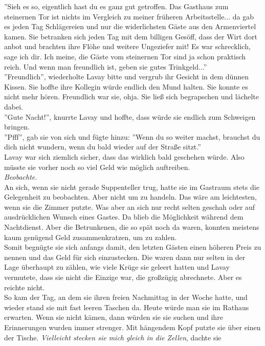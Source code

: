 ''Sieh es so, eigentlich hast du es ganz gut getroffen. Das Gasthaus zum steinernen Tor ist nichts 
im Vergleich zu meiner früheren Arbeitsstelle... da gab es jeden Tag Schlägereien und nur die 
widerlichsten Gäste aus den Armenviertel kamen. Sie betranken sich jeden Tag mit dem billigen 
Gesöff, dass der Wirt dort anbot und brachten ihre Flöhe und weitere Ungeziefer mit! Es war 
schrecklich, sage ich dir. Ich meine, die Gäste vom steinernen Tor sind ja schon praktisch reich. 
Und wenn man freundlich ist, geben sie gutes Trinkgeld...''\\
''Freundlich'', wiederholte Lavay bitte und vergrub ihr Gesicht in dem dünnen Kissen. Sie hoffte 
ihre Kollegin würde endlich den Mund halten. Sie konnte es nicht mehr hören. Freundlich war sie, 
ohja. Sie ließ sich begrapschen und lächelte dabei.\\
''Gute Nacht!'', knurrte Lavay und hoffte, dass würde sie endlich zum Schweigen bringen.\\
''Pfff'', gab sie von sich und fügte hinzu: ''Wenn du so weiter machst, brauchst du dich nicht 
wundern, wenn du bald wieder auf der Straße sitzt.''\\
Lavay war sich ziemlich sicher, dass das wirklich bald geschehen würde. Also müsste sie vorher noch 
so viel Geld wie möglich auftreiben.\\
\textit{Beobachte.}\\
An sich, wenn sie nicht gerade Suppenteller trug, hatte sie im Gastraum stets die Gelegenheit zu 
beobachten. Aber nicht um zu handeln. Das wäre am leichtesten, wenn sie die Zimmer putzte. 
Was aber an sich nur recht selten geschah oder auf ausdrücklichen Wunsch eines Gastes. Da blieb die 
Möglichkeit während dem Nachtdienst. Aber die Betrunkenen, die so spät noch da waren, konnten 
meistens kaum genügend Geld zusammenkratzen, um zu zahlen.\\
Somit begnügte sie sich anfangs damit, den letzten Gästen einen höheren Preis zu nennen und das 
Geld für sich einzustecken. Die waren dann nur selten in der Lage überhaupt zu zählen, wie viele 
Krüge sie geleert hatten und Lavay vermutete, dass sie nicht die Einzige war, die großzügig 
abrechnete. Aber es reichte nicht.\\
So kam der Tag, an dem sie ihren freien Nachmittag in der Woche hatte, und wieder stand sie mit 
fast leeren Taschen da. Heute würde man sie im Rathaus erwarten. Wenn sie nicht kämen, dann würden 
sie sie suchen und ihre Erinnerungen wurden immer strenger. Mit hängendem Kopf putzte sie über 
einen der Tische. \textit{Vielleicht stecken sie mich gleich in die Zellen}, dachte sie 
